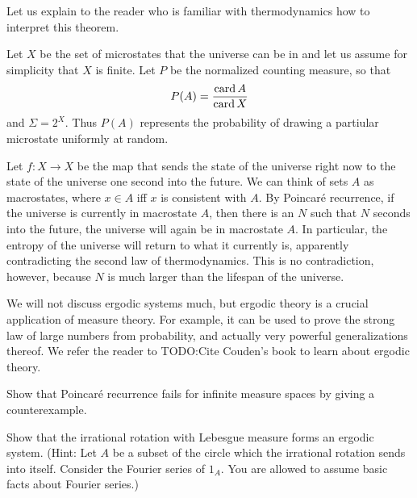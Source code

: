 \begin{subsec}
Let us explain to the reader who is familiar with thermodynamics how to interpret this theorem.

Let $X$ be the set of microstates that the universe can be in and let us assume for simplicity that $X$ is finite.
Let $P$ be the normalized counting measure, so that
$$P(A) = \frac{\operatorname{card} A}{\operatorname{card} X}$$
and $\Sigma = 2^X$.
Thus $P(A)$ represents the probability of drawing a partiular microstate uniformly at random.

Let $f: X \to X$ be the map that sends the state of the universe right now to the state of the universe one second into the future.
We can think of sets $A$ as macrostates, where $x \in A$ iff $x$ is consistent with $A$.
By Poincar\'e recurrence, if the universe is currently in macrostate $A$, then there is an $N$ such that $N$ seconds into the future, the universe will again be in macrostate $A$.
In particular, the entropy of the universe will return to what it currently is, apparently contradicting the second law of thermodynamics.
This is no contradiction, however, because $N$ is much larger than the lifespan of the universe.
\end{subsec}

\begin{subsec}
We will not discuss ergodic systems much, but ergodic theory is a crucial application of measure theory.
For example, it can be used to prove the strong law of large numbers from probability, and actually very powerful generalizations thereof.
We refer the reader to TODO:Cite Couden's book to learn about ergodic theory.
\end{subsec}

\begin{exercise}
Show that Poincar\'e recurrence fails for infinite measure spaces by giving a counterexample.
\end{exercise}

\begin{exercise}
\label{irrational rotation exercise}
Show that the irrational rotation with Lebesgue measure forms an ergodic system.
(Hint: Let $A$ be a subset of the circle which the irrational rotation sends into itself. Consider the Fourier series of $1_A$. You are allowed to assume basic facts about Fourier series.)
\end{exercise}
